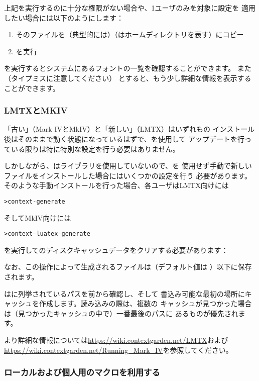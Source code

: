 \documentclass[uplatex,dvipdfmx,12pt,tombow]{jsarticle}
\begin{document}
上記を実行するのに十分な権限がない場合や、1ユーザのみを対象に設定を
適用したい場合には以下のようにします：
%
\begin{enumerate}
\item そのファイルを（典型的には）（\dir{~}はホームディレクトリを表す）にコピー
\item {}を実行
\end{enumerate}

を実行するとシステムにあるフォントの一覧を確認することができます。
また（タイプミスに注意してください）
とすると、もう少し詳細な情報を表示することができます。

\subsubsection{{\ConTeXt} LMTXとMKIV}
\label{sec:context-mkiv}

「古い」\ConTeXt （Mark IVとMkIV）と「新しい」\ConTeXt （LMTX）はいずれも\TL の
インストール後はそのままで動く状態になっているはずで、を使用して
アップデートを行っている限りは特に特別な設定を行う必要はありません。

しかしながら、\ConTeXt は\KPS ライブラリを使用していないので、を
使用せず手動で新しいファイルをインストールした場合にはいくつかの設定を行う
必要があります。そのような手動インストールを行った場合、各ユーザはLMTX向けには
%
\begin{alltt}
> context -generate
\end{alltt}
%
そしてMkIV向けには
%
\begin{alltt}
> context --luatex --generate
\end{alltt}
%
を実行して\ConTeXt のディスクキャッシュデータをクリアする必要があります：

なお、この操作によって生成されるファイルは（デフォルト値は
）以下に保存されます。

\ConTeXt はに列挙されているパスを前から確認し、そして
書込み可能な最初の場所にキャッシュを作成します。読み込みの際は、複数の
キャッシュが見つかった場合は（見つかったキャッシュの中で）一番最後のパスに
あるものが優先されます。

より詳細な情報については\url{https://wiki.contextgarden.net/LMTX}および
\url{https://wiki.contextgarden.net/Running_Mark_IV}を参照してください。

\subsubsection{ローカルおよび個人用のマクロを利用する}
\label{sec:local-personal-macros}
\end{document}
